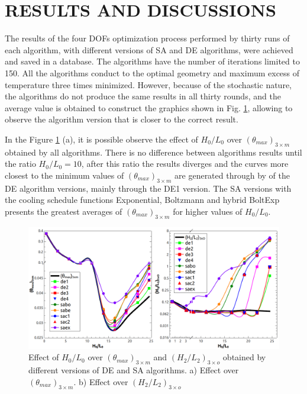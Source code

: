 \documentclass[12pt,fleqn]{article}
\begin{document}
\section{RESULTS AND DISCUSSIONS}

The results of the four DOFs optimization process performed by thirty runs of each algorithm, with different versions of SA and DE algorithms, were achieved and saved in a database. The algorithms have the number of iterations limited to 150. All the algorithms conduct to the optimal geometry and maximum excess of temperature three times minimized. However, because of the stochastic nature, the algorithms do not produce the same results in all thirty rounds, and the average value is obtained to construct the graphics shown in Fig. \ref{figure02}, allowing to observe the algorithm version that is closer to the correct result.


In the Figure \ref{figure02} (a), it is possible observe the effect of $H_{0}/L_{0}$ over $({\theta}_{max})_{3\times m}$ obtained by all algorithms. There is no difference between algorithms results until the ratio $H_{0}/L_{0}=10$, after this ratio the results diverges and the curves more closest to the minimum values of $({\theta}_{max})_{3\times m}$ are generated through by of the DE algorithm versions, mainly through the DE1 version. The SA versions with the cooling schedule functions Exponential, Boltzmann and hybrid BoltExp presents the greatest averages of  $({\theta}_{max})_{3\times m}$  for higher values of $H_{0}/L_{0}$. 

\begin{figure}[H]
\centering
\includegraphics[width=0.9\linewidth]{imgs/4dof/de_sa_h0l0-tmin-4dof.png}
\caption{ {\small Effect of $H_{0}/L_{0}$ over $({\theta}_{max})_{3\times m}$ and $(H_{2}/L_{2})_{3\times o}$ obtained by different versions of DE and SA algorithms. a) Effect over $({\theta}_{max})_{3\times m}$. b) Effect over $(H_{2}/L_{2})_{3\times o}$ }}
\label{figure02}
\end{figure}
\end{document}
